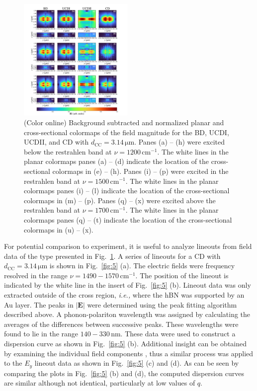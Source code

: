 \documentclass[reprint,
amsmath,amssymb,
aip,
jap,
floatfix,]{revtex4-2}
\begin{document}
			\begin{figure}[!htb]
			  \centering\includegraphics[width=0.49\textwidth]{Figures/Fig4.pdf}
			  \caption{(Color online) Background subtracted and normalized planar and cross-sectional colormaps of the field magnitude for the BD, UCDI, UCDII, and CD with $d_\mathrm{CC} = 3.14 \, \si{\um}$.  Panes (a) -- (h) were excited below the restrahlen band at $\nu = 1200 \, \mathrm{cm}^{-1}$. The white lines in the planar colormaps panes (a) -- (d) indicate the location of the cross-sectional colormaps in (e) -- (h). Panes (i) -- (p) were excited in the restrahlen band at $\nu = 1500 \, \mathrm{cm}^{-1}$. The white lines in the planar colormaps panes (i) -- (l) indicate the location of the cross-sectional colormaps in (m) -- (p). Panes (q) -- (x) were excited above the restrahlen band at $\nu = 1700 \, \mathrm{cm}^{-1}$. The white lines in the planar colormaps panes (q) -- (t) indicate the location of the cross-sectional colormaps in (u) -- (x). 
			  }
			  \label{fig:4}
			\end{figure}

			For potential comparison to experiment, it is useful to analyze lineouts from field data of the type presented in Fig.~\ref{fig:4}. A series of lineouts for a CD with $d_\mathrm{CC} = 3.14 \, \si{\um}$ is shown in Fig.~\ref{fig:5} (a). The electric fields were frequency resolved in the range $\nu = 1490 - 1570 \, \mathrm{cm}^{-1}$. The position of the lineout is indicated by the white line in the insert of Fig.~\ref{fig:5} (b). Lineout data was only extracted outside of the cross region, \textit{i.e.,} where the hBN was supported by an Au layer. The peaks in $|\bm{E}|$ were determined using the peak fitting algorithm described above. A phonon-polariton wavelength was assigned by calculating the averages of the differences between successive peaks. These wavelengths were found to lie in the range $140 - 330 \, \si{\nm}$. These data were used to construct a dispersion curve as shown in Fig.~\ref{fig:5} (b). Additional insight can be obtained by examining the individual field components \cite{Klein:2014}, thus  a similar process was applied to the $E_y$ lineout data as shown in Fig.~\ref{fig:5} (c) and (d). As can be seen by comparing the plots in Fig.~\ref{fig:5} (b) and (d), the computed dispersion curves are similar although not identical, particularly at low values of $q$. 
\end{document}
